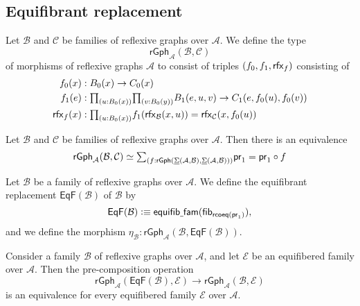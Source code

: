 \subsection{Equifibrant replacement}

\begin{defn}
Let $\mathcal{B}$ and $\mathcal{C}$ be families of reflexive graphs over $\mathcal{A}$. We define the type
\begin{equation*}
\mathsf{rGph}_{\mathcal{A}}(\mathcal{B},\mathcal{C})
\end{equation*}
of morphisms of reflexive graphs  $\mathcal{A}$ to consist of triples $(\pts{f},\edg{f},\rfx{f})$ consisting of
\begin{align*}
\pts{f}(x) & : \pts{B}(x)\to \pts{C}(x) \\
\edg{f}(e) & : \prd{u:\pts{B}(x)}{v:\pts{B}(y)} \edg{B}(e,u,v)\to \edg{C}(e,\pts{f}(u),\pts{f}(v)) \\
\rfx{f}(x) & : \prd{u:\pts{B}(x)} \edg{f}(\rfx{\mathcal{B}}(x,u))=\rfx{\mathcal{C}}(x,\pts{f}(u))
\end{align*}
\end{defn}

\begin{lem}
Let $\mathcal{B}$ and $\mathcal{C}$ be families of reflexive graphs over $\mathcal{A}$. Then there is an equivalence
\begin{equation*}
\eqv{\mathsf{rGph}_{\mathcal{A}}(\mathcal{B},\mathcal{C})}{\sm{f:\mathsf{rGph}(\msm{\mathcal{A}}{\mathcal{B}},\msm{\mathcal{A}}{\mathcal{B}})} \proj 1 = \proj 1 \circ f}
\end{equation*}
\end{lem}

\begin{defn}
Let $\mathcal{B}$ be a family of reflexive graphs over $\mathcal{A}$. We define the equifibrant replacement $\mathsf{EqF}(\mathcal{B})$ of $\mathcal{B}$ by
\begin{equation*}
\mathsf{EqF}(\mathcal{B}) \vcentcolon\equiv \mathsf{equifib\underline{\ }{}fam}(\mathsf{fib}_{\mathsf{rcoeq}(\mathsf{pr}_{1})}),
\end{equation*}
and we define the morphism $\eta_{\mathcal{B}}:\mathsf{rGph}_{\mathcal{A}}(\mathcal{B},\mathsf{EqF}(\mathcal{B}))$. 
\end{defn}

\begin{thm}\label{thm:eqf_initial}
Consider a family $\mathcal{B}$ of reflexive graphs over $\mathcal{A}$, and let $\mathcal{E}$ be an equifibered family over $\mathcal{A}$. Then the pre-composition operation
\begin{equation*}
\mathsf{rGph}_{\mathcal{A}}(\mathsf{EqF}(\mathcal{B}),\mathcal{E})\to \mathsf{rGph}_{\mathcal{A}}(\mathcal{B},\mathcal{E})
\end{equation*}
is an equivalence for every equifibered family $\mathcal{E}$ over $\mathcal{A}$.
\end{thm}

